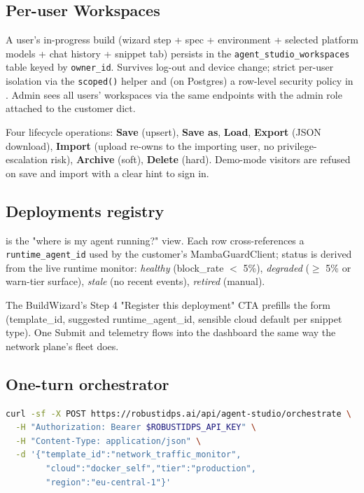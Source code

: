 \documentclass[11pt,a4paper]{article}
\begin{document}
\subsection{Per-user Workspaces}

A user's in-progress build (wizard step + spec + environment +
selected platform models + chat history + snippet tab) persists in
the \texttt{agent\_studio\_workspaces} table keyed by
\texttt{owner\_id}. Survives log-out and device change; strict
per-user isolation via the \texttt{scoped()} helper and (on Postgres)
a row-level security policy in . Admin sees
all users' workspaces via the same endpoints with the admin role
attached to the customer dict.

Four lifecycle operations: \textbf{Save} (upsert),
\textbf{Save as}, \textbf{Load}, \textbf{Export} (JSON download),
\textbf{Import} (upload re-owns to the importing user, no
privilege-escalation risk), \textbf{Archive} (soft),
\textbf{Delete} (hard). Demo-mode visitors are refused on save and
import with a clear hint to sign in.

\subsection{Deployments registry}

 is the "where is my agent running?"
view. Each row cross-references a \texttt{runtime\_agent\_id} used
by the customer's MambaGuardClient; status is derived from the live
runtime monitor: \emph{healthy} (block\_rate $<$ 5\%), \emph{degraded}
($\ge$ 5\% or warn-tier surface), \emph{stale} (no recent events),
\emph{retired} (manual).

The BuildWizard's Step 4 "Register this deployment" CTA prefills the
form (template\_id, suggested runtime\_agent\_id, sensible cloud
default per snippet type). One Submit and telemetry flows into the
dashboard the same way the network plane's fleet does.

\subsection{One-turn orchestrator}

\begin{lstlisting}[language=bash]
curl -sf -X POST https://robustidps.ai/api/agent-studio/orchestrate \
  -H "Authorization: Bearer $ROBUSTIDPS_API_KEY" \
  -H "Content-Type: application/json" \
  -d '{"template_id":"network_traffic_monitor",
        "cloud":"docker_self","tier":"production",
        "region":"eu-central-1"}'
\end{lstlisting}
\end{document}
